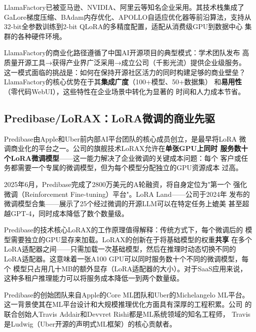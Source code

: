 LlamaFactory已被亚马逊、NVIDIA、阿里云等知名企业采用。其技术栈集成了
GaLore梯度压缩、BAdam内存优化、APOLLO自适应优化器等前沿算法，支持从
32-bit全参数训练到2-bit QLoRA的多精度配置，适配从消费级GPU到数据中心
集群的各种硬件环境。

\begin{whybox}
LlamaFactory的商业化路径遵循了中国AI开源项目的典型模式：学术团队发布
高质量开源工具→获得产业界广泛采用→成立公司（千影光流）提供企业级服务。
这一模式面临的挑战是：如何在保持开源社区活力的同时构建足够的商业壁垒？
LlamaFactory的核心优势在于其\textbf{集成广度}（100+模型、50+数据集）
和\textbf{易用性}（零代码WebUI），这些特性在企业场景中转化为显著的
时间和人力成本节省。
\end{whybox}

\subsection{Predibase/LoRAX：LoRA微调的商业先驱}
\label{subsec:predibase}

Predibase由Apple和Uber前内部AI平台团队的核心成员创立，是最早将LoRA
微调商业化的平台之一。公司的旗舰技术LoRAX允许在\textbf{单张GPU上同时
服务数十个LoRA微调模型}——这一能力解决了企业微调的关键成本问题：每个
客户或任务都需要一个专属的微调模型，但为每个模型分配独立的GPU资源成本
过高。

2025年6月，Predibase完成了2800万美元的A轮融资，将自身定位为"第一个
强化微调（Reinforcement Fine-tuning）平台"。LoRA Land——公司于2024年
发布的微调模型合集——展示了25个经过微调的开源LLM可以在特定任务上媲美
甚至超越GPT-4，同时成本降低了数个数量级。

Predibase的技术核心LoRAX的工作原理值得解释：传统方式下，每个微调后的
模型需要独立的GPU显存来加载。LoRAX的创新在于将基础模型的权重\textbf{共享}
在多个LoRA适配器之间——只需加载一次基础模型，然后在推理时动态切换不同的
LoRA适配器。这意味着一张A100 GPU可以同时服务数十个不同的微调模型，每个
模型只占用几十MB的额外显存（LoRA适配器的大小）。对于SaaS应用来说，
这种多租户推理能力可以将服务成本降低一到两个数量级。

Predibase的创始团队来自Apple的Core ML团队和Uber的Michelangelo ML平台。
这一背景使其在ML平台设计和大规模推理优化方面具有深厚的工程积累。公司
的联合创始人Travis Addair和Devvret Rishi都是ML系统领域的知名工程师，
Travis是Ludwig（Uber开源的声明式ML框架）的核心贡献者。

